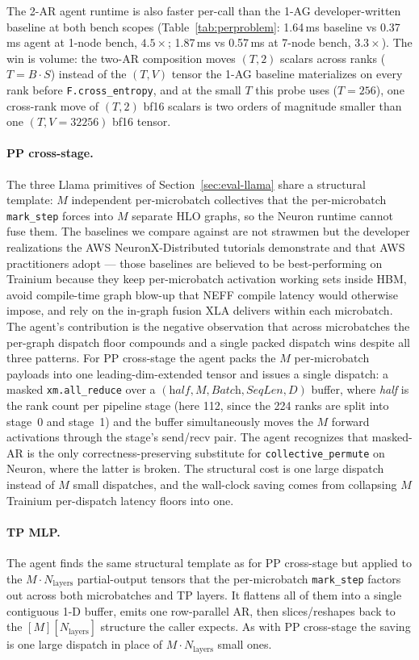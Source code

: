 The 2-AR agent runtime is also faster per-call than the 1-AG
developer-written baseline at both bench scopes
(Table~\ref{tab:perproblem}: 1.64\,ms baseline vs 0.37\,ms agent
at 1-node bench, $4.5\times$; 1.87\,ms vs 0.57\,ms at 7-node
bench, $3.3\times$). The win is volume: the two-AR composition
moves $(T, 2)$ scalars across ranks ($T = B \cdot S$) instead of
the $(T, V)$ tensor the 1-AG baseline materializes on every rank
before \texttt{F.cross\_entropy}, and at the small $T$ this
probe uses ($T{=}256$), one cross-rank move of $(T, 2)$ bf16
scalars is two orders of magnitude smaller than one
$(T, V{=}32256)$ bf16 tensor.

\paragraph{PP cross-stage.} The three Llama primitives of
Section~\ref{sec:eval-llama} share a structural template: $M$
independent per-microbatch collectives that the per-microbatch
\texttt{mark\_step} forces into $M$ separate HLO graphs, so the
Neuron runtime cannot fuse them. The baselines we compare against
are not strawmen but the developer realizations the AWS
NeuronX-Distributed tutorials demonstrate and that AWS
practitioners adopt --- those baselines are believed to be
best-performing on Trainium because they keep per-microbatch
activation working sets inside HBM, avoid compile-time graph
blow-up that NEFF compile latency would otherwise impose, and
rely on the in-graph fusion XLA delivers within each microbatch.
The agent's contribution is the negative observation that across
microbatches the per-graph dispatch floor compounds and a single
packed dispatch wins despite all three patterns. For PP
cross-stage the agent packs the $M$ per-microbatch payloads into
one leading-dim-extended tensor and issues a single dispatch:
a masked \texttt{xm.all\_reduce} over a
$(\textit{half}, M, \textit{Batch}, \textit{SeqLen}, D)$ buffer,
where \textit{half} is the rank count per pipeline stage
(here 112, since the 224 ranks are split into stage~0 and
stage~1) and the buffer simultaneously moves the $M$ forward
activations through the stage's send/recv pair. The agent
recognizes that masked-AR is the only correctness-preserving
substitute for \texttt{collective\_permute} on Neuron, where
the latter is broken. The structural cost is one large dispatch
instead of $M$ small dispatches, and the wall-clock saving comes
from collapsing $M$ Trainium per-dispatch latency floors into
one.

\paragraph{TP MLP.} The agent finds the same structural template
as for PP cross-stage but applied to the
$M \cdot N_\text{layers}$ partial-output tensors that the
per-microbatch \texttt{mark\_step} factors out across both
microbatches and TP layers. It flattens all of them into a single
contiguous 1-D buffer, emits one row-parallel AR, then
slices/reshapes back to the $[M][N_\text{layers}]$ structure the
caller expects. As with PP cross-stage the saving is one large
dispatch in place of $M \cdot N_\text{layers}$ small ones.

